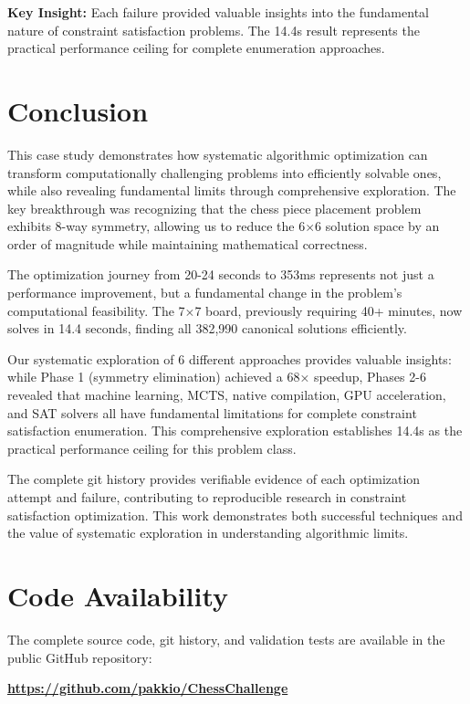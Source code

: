 \documentclass[12pt,a4paper]{article}
\theoremstyle{definition}
\begin{document}
\textbf{Key Insight:} Each failure provided valuable insights into the fundamental nature of constraint satisfaction problems. The 14.4s result represents the practical performance ceiling for complete enumeration approaches.

\section{Conclusion}

This case study demonstrates how systematic algorithmic optimization can transform computationally challenging problems into efficiently solvable ones, while also revealing fundamental limits through comprehensive exploration. The key breakthrough was recognizing that the chess piece placement problem exhibits 8-way symmetry, allowing us to reduce the 6$\times$6 solution space by an order of magnitude while maintaining mathematical correctness.

The optimization journey from 20-24 seconds to 353ms represents not just a performance improvement, but a fundamental change in the problem's computational feasibility. The 7$\times$7 board, previously requiring 40+ minutes, now solves in 14.4 seconds, finding all 382,990 canonical solutions efficiently.

Our systematic exploration of 6 different approaches provides valuable insights: while Phase 1 (symmetry elimination) achieved a 68× speedup, Phases 2-6 revealed that machine learning, MCTS, native compilation, GPU acceleration, and SAT solvers all have fundamental limitations for complete constraint satisfaction enumeration. This comprehensive exploration establishes 14.4s as the practical performance ceiling for this problem class.

The complete git history provides verifiable evidence of each optimization attempt and failure, contributing to reproducible research in constraint satisfaction optimization. This work demonstrates both successful techniques and the value of systematic exploration in understanding algorithmic limits.

\section{Code Availability}

The complete source code, git history, and validation tests are available in the public GitHub repository:

\begin{center}
\textbf{\url{https://github.com/pakkio/ChessChallenge}}
\end{center}
\end{document}
